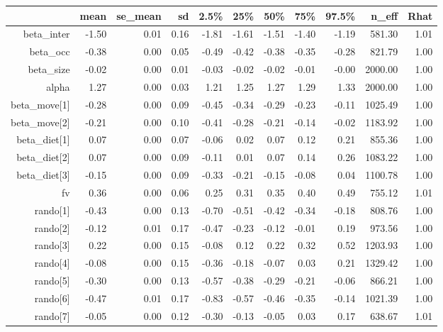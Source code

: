 \begin{table}[ht]
\centering
\begin{tabular}{rrrrrrrrrrr}
  \hline
 & mean & se\_mean & sd & 2.5\% & 25\% & 50\% & 75\% & 97.5\% & n\_eff & Rhat \\ 
  \hline
beta\_inter & -1.50 & 0.01 & 0.16 & -1.81 & -1.61 & -1.51 & -1.40 & -1.19 & 581.30 & 1.01 \\ 
  beta\_occ & -0.38 & 0.00 & 0.05 & -0.49 & -0.42 & -0.38 & -0.35 & -0.28 & 821.79 & 1.00 \\ 
  beta\_size & -0.02 & 0.00 & 0.01 & -0.03 & -0.02 & -0.02 & -0.01 & -0.00 & 2000.00 & 1.00 \\ 
  alpha & 1.27 & 0.00 & 0.03 & 1.21 & 1.25 & 1.27 & 1.29 & 1.33 & 2000.00 & 1.00 \\ 
  beta\_move[1] & -0.28 & 0.00 & 0.09 & -0.45 & -0.34 & -0.29 & -0.23 & -0.11 & 1025.49 & 1.00 \\ 
  beta\_move[2] & -0.21 & 0.00 & 0.10 & -0.41 & -0.28 & -0.21 & -0.14 & -0.02 & 1183.92 & 1.00 \\ 
  beta\_diet[1] & 0.07 & 0.00 & 0.07 & -0.06 & 0.02 & 0.07 & 0.12 & 0.21 & 855.36 & 1.00 \\ 
  beta\_diet[2] & 0.07 & 0.00 & 0.09 & -0.11 & 0.01 & 0.07 & 0.14 & 0.26 & 1083.22 & 1.00 \\ 
  beta\_diet[3] & -0.15 & 0.00 & 0.09 & -0.33 & -0.21 & -0.15 & -0.08 & 0.04 & 1100.78 & 1.00 \\ 
  fv & 0.36 & 0.00 & 0.06 & 0.25 & 0.31 & 0.35 & 0.40 & 0.49 & 755.12 & 1.01 \\ 
  rando[1] & -0.43 & 0.00 & 0.13 & -0.70 & -0.51 & -0.42 & -0.34 & -0.18 & 808.76 & 1.00 \\ 
  rando[2] & -0.12 & 0.01 & 0.17 & -0.47 & -0.23 & -0.12 & -0.01 & 0.19 & 973.56 & 1.00 \\ 
  rando[3] & 0.22 & 0.00 & 0.15 & -0.08 & 0.12 & 0.22 & 0.32 & 0.52 & 1203.93 & 1.00 \\ 
  rando[4] & -0.08 & 0.00 & 0.15 & -0.36 & -0.18 & -0.07 & 0.03 & 0.21 & 1329.42 & 1.00 \\ 
  rando[5] & -0.30 & 0.00 & 0.13 & -0.57 & -0.38 & -0.29 & -0.21 & -0.06 & 866.21 & 1.00 \\ 
  rando[6] & -0.47 & 0.01 & 0.17 & -0.83 & -0.57 & -0.46 & -0.35 & -0.14 & 1021.39 & 1.00 \\ 
  rando[7] & -0.05 & 0.00 & 0.12 & -0.30 & -0.13 & -0.05 & 0.03 & 0.17 & 638.67 & 1.01 \\ 

\end{tabular}
\end{table}
